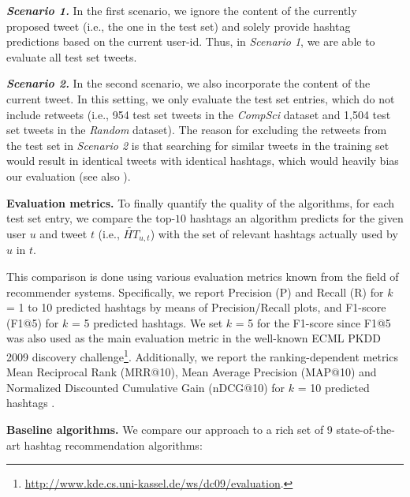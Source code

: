 \documentclass{sig-alternate-05-2015}
\newcommand{\para}[1]{\vspace{2mm}\noindent\textbf{#1}}
\newcommand{\subpara}[1]{\textit{\textbf{#1}}}
\begin{document}
\subpara{\textit{Scenario 1}{}.} In the first scenario, we ignore the content of the currently proposed tweet (i.e., the one in the test set) and solely provide hashtag predictions based on the current user-id. Thus, in \textit{Scenario 1}{}, we are able to evaluate all test set tweets.

\subpara{\textit{Scenario 2}{}.} In the second scenario, we also incorporate the content of the current tweet. In this setting, we only evaluate the test set entries, which do not include retweets (i.e., 954 test set tweets in the \textit{CompSci}{} dataset and 1,504 test set tweets in the \textit{Random}{} dataset). The reason for excluding the retweets from the test set in \textit{Scenario 2}{} is that searching for similar tweets in the training set would result in identical tweets with identical hashtags, which would heavily bias our evaluation (see also \cite{zangerle2011recommending}).

\para{Evaluation metrics.} To finally quantify the quality of the algorithms, for each test set entry, we compare the top-$10$ hashtags an algorithm predicts for the given user $u$ and tweet $t$ (i.e., $\widetilde{HT}_{u,t}$) with the set of relevant hashtags actually used by $u$ in $t$.

This comparison is done using various evaluation metrics known from the field of recommender systems. Specifically, we report Precision (P) and Recall (R) for $k$ = 1 to 10 predicted hashtags by means of Precision/Recall plots, and F1-score (F1@5) for $k$ = 5 predicted hashtags. We set $k$ = 5 for the F1-score since F1@5 was also used as the main evaluation metric in the well-known ECML PKDD 2009 discovery challenge\footnote{\url{http://www.kde.cs.uni-kassel.de/ws/dc09/evaluation}.}. Additionally, we report the ranking-dependent metrics Mean Reciprocal Rank (MRR@10), Mean Average Precision (MAP@10) and Normalized Discounted Cumulative Gain (nDCG@10) for $k$ = 10 predicted hashtags \cite{jarvelinMetrics}.

\para{Baseline algorithms.} We compare our approach to a rich set of 9 state-of-the-art hashtag recommendation algorithms:
\end{document}
